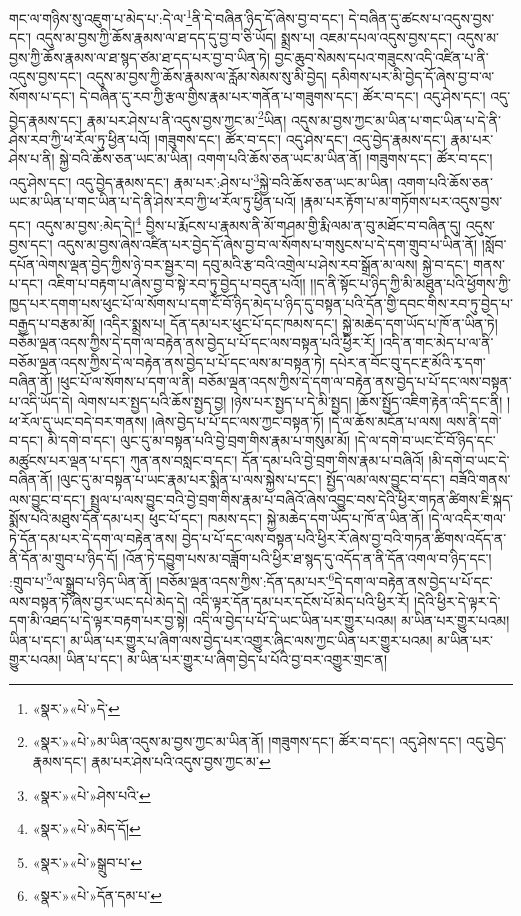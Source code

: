 གང་ལ་གཉིས་སུ་འཇུག་པ་མེད་པ་:དེ་ལ་\footnote{«སྣར་»«པེ་»དེ་}ནི་དེ་བཞིན་ཉིད་དོ་ཞེས་བྱ་བ་དང་། དེ་བཞིན་དུ་ཚངས་པ་འདུས་བྱས་དང་། འདུས་མ་བྱས་ཀྱི་ཆོས་རྣམས་ལ་ཐ་དད་དུ་བྱ་བ་ཅི་ཡོད། སྨྲས་པ། འཇམ་དཔལ་འདུས་བྱས་དང་། འདུས་མ་བྱས་ཀྱི་ཆོས་རྣམས་ལ་ཐ་སྙད་ཙམ་ཐ་དད་པར་བྱ་བ་ཡིན་ཏེ། བྱང་ཆུབ་སེམས་དཔའ་གཟུངས་འདི་འཛིན་པ་ནི་འདུས་བྱས་དང་། འདུས་མ་བྱས་ཀྱི་ཆོས་རྣམས་ལ་རློམ་སེམས་སུ་མི་བྱེད། དམིགས་པར་མི་བྱེད་དོ་ཞེས་བྱ་བ་ལ་སོགས་པ་དང་། དེ་བཞིན་དུ་རབ་ཀྱི་རྩལ་གྱིས་རྣམ་པར་གནོན་པ་གཟུགས་དང་། ཚོར་བ་དང་། འདུ་ཤེས་དང་། འདུ་བྱེད་རྣམས་དང་། རྣམ་པར་ཤེས་པ་ནི་འདུས་བྱས་ཀྱང་མ་\footnote{«སྣར་»«པེ་»མ་ཡིན་འདུས་མ་བྱས་ཀྱང་མ་ཡིན་ནོ། །གཟུགས་དང་། ཚོར་བ་དང་། འདུ་ཤེས་དང་། འདུ་བྱེད་རྣམས་དང་། རྣམ་པར་ཤེས་པའི་འདུས་བྱས་ཀྱང་མ་}ཡིན། འདུས་མ་བྱས་ཀྱང་མ་ཡིན་པ་གང་ཡིན་པ་དེ་ནི་ཤེས་རབ་ཀྱི་ཕ་རོལ་ཏུ་ཕྱིན་པའོ། །གཟུགས་དང་། ཚོར་བ་དང་། འདུ་ཤེས་དང་། འདུ་བྱེད་རྣམས་དང་། རྣམ་པར་ཤེས་པ་ནི། སྐྱེ་བའི་ཆོས་ཅན་ཡང་མ་ཡིན། འགག་པའི་ཆོས་ཅན་ཡང་མ་ཡིན་ནོ། །གཟུགས་དང་། ཚོར་བ་དང་། འདུ་ཤེས་དང་། འདུ་བྱེད་རྣམས་དང་། རྣམ་པར་:ཤེས་པ་\footnote{«སྣར་»«པེ་»ཤེས་པའི་}སྐྱེ་བའི་ཆོས་ཅན་ཡང་མ་ཡིན། འགག་པའི་ཆོས་ཅན་ཡང་མ་ཡིན་པ་གང་ཡིན་པ་དེ་ནི་ཤེས་རབ་ཀྱི་ཕ་རོལ་ཏུ་ཕྱིན་པའོ། །རྣམ་པར་རྟོག་པ་མ་གཏོགས་པར་འདུས་བྱས་དང་། འདུས་མ་བྱས་:མེད་དེ།\footnote{«སྣར་»«པེ་»མེད་དོ།} བྱིས་པ་རྨོངས་པ་རྣམས་ནི་མོ་གཤམ་གྱི་རྨི་ལམ་ན་བུ་མཐོང་བ་བཞིན་དུ། འདུས་བྱས་དང་། འདུས་མ་བྱས་ཞེས་འཛིན་པར་བྱེད་དོ་ཞེས་བྱ་བ་ལ་སོགས་པ་གསུངས་པ་དེ་དག་གྲུབ་པ་ཡིན་ནོ། །སློབ་དཔོན་ལེགས་ལྡན་བྱེད་ཀྱིས་ཉེ་བར་སྦྱར་བ། དབུ་མའི་རྩ་བའི་འགྲེལ་པ་ཤེས་རབ་སྒྲོན་མ་ལས། སྐྱེ་བ་དང་། གནས་པ་དང་། འཇིག་པ་བརྟག་པ་ཞེས་བྱ་བ་སྟེ་རབ་ཏུ་བྱེད་པ་བདུན་པའོ།། །།ད་ནི་སྟོང་པ་ཉིད་ཀྱི་མི་མཐུན་པའི་ཕྱོགས་ཀྱི་ཁྱད་པར་དགག་པས་ཕུང་པོ་ལ་སོགས་པ་དག་ངོ་བོ་ཉིད་མེད་པ་ཉིད་དུ་བསྟན་པའི་དོན་གྱི་དབང་གིས་རབ་ཏུ་བྱེད་པ་བརྒྱད་པ་བརྩམ་མོ། །འདིར་སྨྲས་པ། དོན་དམ་པར་ཕུང་པོ་དང་ཁམས་དང་། སྐྱེ་མཆེད་དག་ཡོད་པ་ཁོ་ན་ཡིན་ཏེ། བཅོམ་ལྡན་འདས་ཀྱིས་དེ་དག་ལ་བརྟེན་ནས་བྱེད་པ་པོ་དང་ལས་བསྟན་པའི་ཕྱིར་རོ། །འདི་ན་གང་མེད་པ་ལ་ནི་བཅོམ་ལྡན་འདས་ཀྱིས་དེ་ལ་བརྟེན་ནས་བྱེད་པ་པོ་དང་ལས་མ་བསྟན་ཏེ། དཔེར་ན་བོང་བུ་དང་རྔ་མོའི་རྭ་དག་བཞིན་ནོ། །ཕུང་པོ་ལ་སོགས་པ་དག་ལ་ནི། བཅོམ་ལྡན་འདས་ཀྱིས་དེ་དག་ལ་བརྟེན་ནས་བྱེད་པ་པོ་དང་ལས་བསྟན་པ་འདི་ཡོད་དེ། ལེགས་པར་སྤྱད་པའི་ཆོས་སྤྱད་བྱ། །ཉེས་པར་སྤྱད་པ་དེ་མི་སྤྱད། །ཆོས་སྤྱོད་འཇིག་རྟེན་འདི་དང་ནི། །ཕ་རོལ་དུ་ཡང་བདེ་བར་གནས། །ཞེས་བྱེད་པ་པོ་དང་ལས་ཀྱང་བསྟན་ཏོ། །དེ་ལ་ཆོས་མངོན་པ་ལས། ལས་ནི་དགེ་བ་དང་། མི་དགེ་བ་དང་། ལུང་དུ་མ་བསྟན་པའི་བྱེ་བྲག་གིས་རྣམ་པ་གསུམ་མོ། །དེ་ལ་དགེ་བ་ཡང་ངོ་བོ་ཉིད་དང་མཚུངས་པར་ལྡན་པ་དང་། ཀུན་ནས་བསླང་བ་དང་། དོན་དམ་པའི་བྱེ་བྲག་གིས་རྣམ་པ་བཞིའོ། །མི་དགེ་བ་ཡང་དེ་བཞིན་ནོ། །ལུང་དུ་མ་བསྟན་པ་ཡང་རྣམ་པར་སྨིན་པ་ལས་སྐྱེས་པ་དང་། སྤྱོད་ལམ་ལས་བྱུང་བ་དང་། བཟོའི་གནས་ལས་བྱུང་བ་དང་། སྤྲུལ་པ་ལས་བྱུང་བའི་བྱེ་བྲག་གིས་རྣམ་པ་བཞིའོ་ཞེས་འབྱུང་བས་དེའི་ཕྱིར་གཏན་ཚིགས་ཇི་སྐད་སྨོས་པའི་མཐུས་དོན་དམ་པར། ཕུང་པོ་དང་། ཁམས་དང་། སྐྱེ་མཆེད་དག་ཡོད་པ་ཁོ་ན་ཡིན་ནོ། །དེ་ལ་འདིར་གལ་ཏེ་དོན་དམ་པར་དེ་དག་ལ་བརྟེན་ནས། བྱེད་པ་པོ་དང་ལས་བསྟན་པའི་ཕྱིར་རོ་ཞེས་བྱ་བའི་གཏན་ཚིགས་འདོད་ན་ནི་དོན་མ་གྲུབ་པ་ཉིད་དོ། །འོན་ཏེ་དབྱུག་པས་མ་བཟློག་པའི་ཕྱིར་ཐ་སྙད་དུ་འདོད་ན་ནི་དོན་འགལ་བ་ཉིད་དང་། :གྲུབ་པ་\footnote{«སྣར་»«པེ་»སྒྲུབ་པ་}ལ་སྒྲུབ་པ་ཉིད་ཡིན་ནོ། །བཅོམ་ལྡན་འདས་ཀྱིས་:དོན་དམ་པར་\footnote{«སྣར་»«པེ་»དོན་དམ་པ་}དེ་དག་ལ་བརྟེན་ནས་བྱེད་པ་པོ་དང་ལས་བསྟན་ཏོ་ཞེས་བྱར་ཡང་དཔེ་མེད་དེ། འདི་ལྟར་དོན་དམ་པར་དངོས་པོ་མེད་པའི་ཕྱིར་རོ། །དེའི་ཕྱིར་དེ་ལྟར་དེ་དག་མི་འཐད་པ་དེ་ལྟར་བརྟག་པར་བྱ་སྟེ། འདི་ལ་བྱེད་པ་པོ་དེ་ཡང་ཡིན་པར་གྱུར་པའམ། མ་ཡིན་པར་གྱུར་པའམ། ཡིན་པ་དང་། མ་ཡིན་པར་གྱུར་པ་ཞིག་ལས་བྱེད་པར་འགྱུར་ཞིང་ལས་ཀྱང་ཡིན་པར་གྱུར་པའམ། མ་ཡིན་པར་གྱུར་པའམ། ཡིན་པ་དང་། མ་ཡིན་པར་གྱུར་པ་ཞིག་བྱེད་པ་པོའི་བྱ་བར་འགྱུར་གྲང་ན། 
